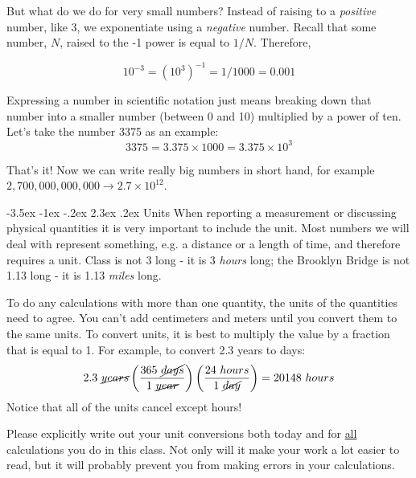 \documentclass[12pt]{article}
\makeatletter
\renewcommand\section{\@startsection{section}{1}{\z@}%
                                  {-3.5ex \@plus -1ex \@minus -.2ex}%
                                  {2.3ex \@plus.2ex}%
                                  {\normalfont\large\bfseries}}
\makeatother
\begin{document}
But what do we do for very small numbers? Instead of raising to a \textit{positive} number, like 3, we exponentiate using a \textit{negative} number. Recall that some number, $N$, raised to the -1 power is equal to $1/N$. Therefore,

\begin{equation*}
	10^{-3} = (10^3)^{-1} = 1/1000 = 0.001
\end{equation*}

Expressing a number in scientific notation just means breaking down that number into a smaller number (between 0 and 10) multiplied by a power of ten. Let's take the number 3375 as an example:
\begin{equation*}
	3375 = 3.375\times1000 = 3.375 \times 10^3
\end{equation*}

That's it! Now we can write really big numbers in short hand, for example $2,700,000,000,000 \rightarrow 2.7\times 10^{12}$.

\clearpage

%
%
\section{Units}
When reporting a measurement or discussing physical quantities it is very important to include the unit. Most numbers we will deal with represent something, e.g. a distance or a length of time, and therefore requires a unit. Class is not 3 long - it is 3 \emph{hours} long; the Brooklyn Bridge is not 1.13 long - it is 1.13 \emph{miles} long.

\vspace{0.2in}
To do any calculations with more than one quantity, the units of the quantities need to agree.  You can't add centimeters and meters until you convert them to the same units.  To convert units, it is best to multiply the value by a fraction that is equal to 1.  For example, to convert 2.3 years to days:
\begin{equation}
2.3~\cancel{years} \left(\frac{365~\cancel{days}}{1~\cancel{year}}\right)\left(\frac{24~hours}{1~\cancel{day}}\right) = 20148~hours
\end{equation}
Notice that all of the units cancel except hours!

\vspace{0.2in}
Please explicitly write out your unit conversions both today and for \underline{all} calculations you do in this class.  Not only will it make your work a lot easier to read, but it will probably prevent you from making errors in your calculations.
\end{document}
